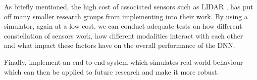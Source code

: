 As briefly mentioned, the high cost of associated sensors such as LIDAR
\cite{VergeReportLidar},  has put off many smaller research groups from implementing into their
work. By using a simulator, again at a low cost, we can conduct adequate tests
on how different constellation of sensors work, how different modalities interact with each other and
what impact these factors have on the overall performance of the DNN.

Finally, implement an end-to-end system which simulates real-world behaviour which can
then be applied to future research and make it more robust.

